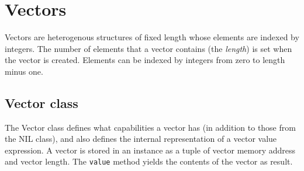 \documentclass[twoside]{report}
\begin{document}
\section{Vectors}
\label{vectors}

Vectors are heterogenous structures of fixed length whose elements are indexed by integers. The number of elements that a vector contains (the \emph{length}) is set when the vector is created. Elements can be indexed by integers from zero to length minus one.

\subsection{Vector class}
\label{vector-class}

The Vector class defines what capabilities a vector has (in addition to those from the NIL class), and also defines the internal representation of a vector value expression. A vector is stored in an instance as a tuple of vector memory address and vector length. The \texttt{value} method yields the contents of the vector as result.
\end{document}
